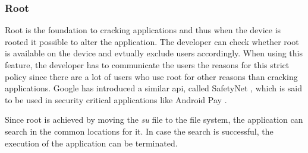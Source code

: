 \subsubsection{Root} \label{subsection:counter-improve-tampering-root}
Root is the foundation to cracking applications and thus when the device is rooted it possible to alter the application.
The developer can check whether root is available on the device and evtually exclude users accordingly.
When using this feature, the developer has to communicate the users the reasons for this strict policy since there are a lot of users who use root for other reasons than cracking applications.
Google has introduced a similar \gls{api}, called SafetyNet \cite{safetynetPay}, which is said to be used in security critical applications like Android Pay \cite{safetynetGoogle}.
\newline

Since root is achieved by moving the \textit{su} file to the file system, the application can search in the common locations for it.
In case the search is successful, the execution of the application can be terminated.
